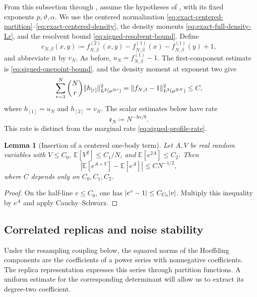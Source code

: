 \documentclass[11pt,reqno]{amsart}
\numberwithin{equation}{section}
\theoremstyle{plain}
\newtheorem{lemma}[lemma]{Lemma}
\theoremstyle{remark}
\DeclarePairedDelimiter{\abs}{\lvert}{\rvert}
\DeclarePairedDelimiter{\norm}{\lVert}{\rVert}
\newcommand{\E}{{\mathbb{E}}}
\newcommand{\be}{\beta}
\begin{document}
From this subsection through , assume the
hypotheses of , with its fixed
exponents $p,\vartheta,\alpha$.  
We use the centered normalization
\eqref{eq:exact-centered-partition}--\eqref{eq:exact-centered-density}, the
density moments \eqref{eq:exact-full-density-Lr}, and the resolvent bound
\eqref{eq:signed-resolvent-bound}.  Define
\begin{equation}\label{eq:weak-second-model-v-def}
 v_{N,\be}(x,y)\coloneqq f_{N,\be}^{(2)}(x,y)
       -f_{N,\be}^{(1)}(x)-f_{N,\be}^{(1)}(y)+1,
\end{equation}
and abbreviate it by $v_N$.  As before, $u_N=f_{N,\be}^{(1)}-1$.
The first-component estimate is \eqref{eq:signed-onepoint-bound}.
 and the density moment at exponent two give
\begin{equation}\label{eq:exact-level-control}
 \sum_{r=1}^N\binom Nr\norm{h_{[r]}}_{L^2(\mu^{\otimes r})}^2
 =\norm{f_{N,\be}-1}_{L^2(\mu^{\otimes N})}^2\leq C,
\end{equation}
where $h_{[1]}=u_N$ and $h_{[2]}=v_N$.
The scalar estimates below have rate
\begin{equation}\label{eq:quantitative-partition-error}
 \mathfrak e_N\coloneqq N^{-3\alpha/8}.
\end{equation}
This rate is distinct from the marginal rate
\eqref{eq:signed-profile-rate}.

\begin{lemma}[Insertion of a centered one-body term]
\label{lem:signed-source-insertion}
Let $A,V$ be real random variables with $V\leq C_0$,
$\E[V^2]\leq C_1/N$, and $\E[e^{2A}]\leq C_2$.  Then
\begin{equation}\label{eq:signed-source-insertion}
 \left|\E[e^{A+V}]-\E[e^A]\right|\leq C N^{-1/2},
\end{equation}
where $C$ depends only on $C_0,C_1,C_2$.
\end{lemma}
\begin{proof}
On the half-line $v\leq C_0$, one has $\abs{e^v-1}\leq C_{C_0}\abs v$.
Multiply this inequality by $e^A$ and apply Cauchy--Schwarz.
\end{proof}

\subsection{Correlated replicas and noise stability}
\label{subsubsec:exact-profile-strong-pair}

Under the resampling coupling below, the squared norms of the Hoeffding components are the coefficients of a power series with nonnegative coefficients.  The replica representation expresses this series through partition functions.  A uniform estimate for the corresponding determinant will allow us to extract its degree-two coefficient.
\end{document}
